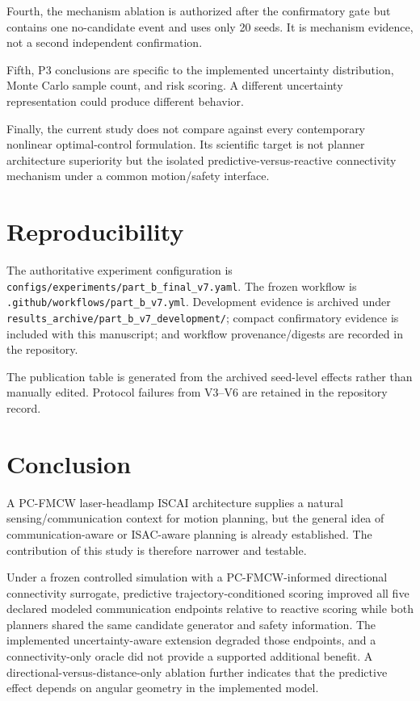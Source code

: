 \documentclass[journal]{IEEEtran}
\begin{document}
Fourth, the mechanism ablation is authorized after the confirmatory gate but contains one no-candidate event and uses only 20 seeds. It is mechanism evidence, not a second independent confirmation.

Fifth, P3 conclusions are specific to the implemented uncertainty distribution, Monte Carlo sample count, and risk scoring. A different uncertainty representation could produce different behavior.

Finally, the current study does not compare against every contemporary nonlinear optimal-control formulation. Its scientific target is not planner architecture superiority but the isolated predictive-versus-reactive connectivity mechanism under a common motion/safety interface.

\section{Reproducibility}
The authoritative experiment configuration is \texttt{configs/experiments/part\_b\_final\_v7.yaml}. The frozen workflow is \texttt{.github/workflows/part\_b\_v7.yml}. Development evidence is archived under \texttt{results\_archive/part\_b\_v7\_development/}; compact confirmatory evidence is included with this manuscript; and workflow provenance/digests are recorded in the repository.

The publication table is generated from the archived seed-level effects rather than manually edited. Protocol failures from V3--V6 are retained in the repository record.

\section{Conclusion}
A PC-FMCW laser-headlamp ISCAI architecture supplies a natural sensing/communication context for motion planning, but the general idea of communication-aware or ISAC-aware planning is already established. The contribution of this study is therefore narrower and testable.

Under a frozen controlled simulation with a PC-FMCW-informed directional connectivity surrogate, predictive trajectory-conditioned scoring improved all five declared modeled communication endpoints relative to reactive scoring while both planners shared the same candidate generator and safety information. The implemented uncertainty-aware extension degraded those endpoints, and a connectivity-only oracle did not provide a supported additional benefit. A directional-versus-distance-only ablation further indicates that the predictive effect depends on angular geometry in the implemented model.
\end{document}
